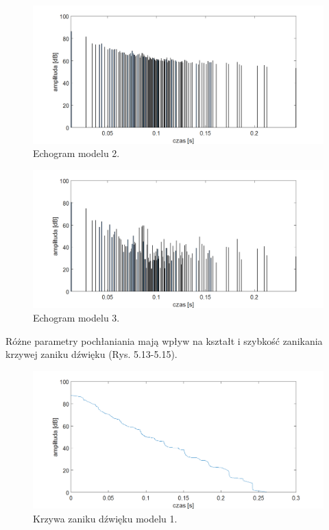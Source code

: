 \begin{figure}[h]
        \centering
                \centering
                \includegraphics[width=16cm]{echo2z}
	\caption{Echogram modelu 2.}
\end{figure}

\begin{figure}[h]
        \centering
                \centering
                \includegraphics[width=16cm]{echoz3}
	\caption{Echogram modelu 3.}
\end{figure}

Różne parametry pochłaniania mają wpływ na kształt i szybkość zanikania krzywej zaniku dźwięku (Rys. 5.13-5.15).

\begin{figure}[h]
        \centering
                \centering
                \includegraphics[width=16cm]{zanikz1}
	\caption{Krzywa zaniku dźwięku modelu 1.}
\end{figure}

